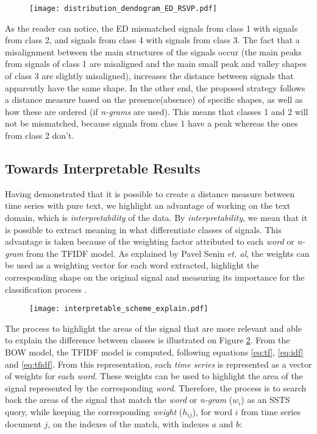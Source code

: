 {\begin{figure}
    \centering
    \texttt{[image: distribution\_dendogram\_ED\_RSVP.pdf]}
    \caption{}
    \label{fig:distribution_dendogram}
\end{figure}
 
As the reader can notice, the \gls{ED} mismatched signals from class 1 with signals from class 2, and signals from class 4 with signals from class 3. The fact that a misalignment between the main structures of the signals occur (the main peaks from signals of class 1 are misaligned and the main small peak and valley shapes of class 3 are slightly misaligned), increases the distance between signals that apparently have the same shape. In the other end, the proposed strategy follows a distance measure based on the presence(absence) of specific shapes, as well as how these are ordered (if \textit{n-grams} are used). This means that classes 1 and 2 will not be mismatched, because signals from class 1 have a peak whereas the ones from class 2 don't.

\subsection{Towards Interpretable Results}

Having demonstrated that it is possible to create a distance measure between time series with pure text, we highlight an advantage of working on the text domain, which is \textit{interpretability} of the data. By \textit{interpretability}, we mean that it is possible to extract meaning in what differentiate classes of signals. This advantage is taken because of the weighting factor attributed to each \textit{word} or \textit{n-gram} from the \gls{TFIDF} model. As explained by Pavel Senin \textit{et. al}, the weights can be used as a weighting vector for each word extracted, highlight the corresponding shape on the original signal and measuring its importance for the classification process \cite{sax_vsm}.

\begin{figure}
    \centering
    \texttt{[image: interpretable\_scheme\_explain.pdf]}
    \caption{}
    \label{fig:interpretable_step}
\end{figure}


The process to highlight the areas of the signal that are more relevant and able to explain the difference between classes is illustrated on Figure \ref{fig:interpretable_step}. From the \gls{BOW} model, the \gls{TFIDF} model is computed, following equations \ref{eq:tf}, \ref{eq:idf} and \ref{eq:tfidf}. From this representation, each \textit{time series} is represented as a vector of weights for each \textit{word}. These weights can be used to highlight the area of the signal represented by the corresponding \textit{word}. Therefore, the process is to search back the areas of the signal that match the \textit{word} or \textit{n-gram} ($w_i$) as an \gls{SSTS} query, while keeping the corresponding \textit{weight} ($h_{ij}$), for word $i$ from time series document $j$, on the indexes of the match, with indexes $a$ and $b$:

}
